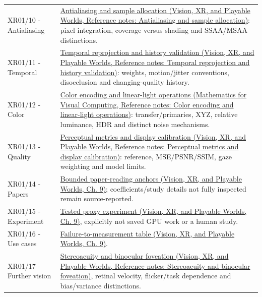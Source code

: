 {\begin{longtable}[]{@{}
  >{\raggedright\arraybackslash}p{}
  >{\raggedright\arraybackslash}p{}@{}}
XR01/10 - Antialiasing & \href{../07-Vision-XR-and-Playable-Worlds/main.pdf\#nameddest=appendix-4192b2bdd21e}{Antialiasing and sample allocation (Vision, XR, and Playable Worlds, Reference notes: Antialiasing and sample allocation)}: pixel integration, coverage versus shading and SSAA/MSAA distinctions. \\
XR01/11 - Temporal & \href{../07-Vision-XR-and-Playable-Worlds/main.pdf\#nameddest=appendix-0727340a4428}{Temporal reprojection and history validation (Vision, XR, and Playable Worlds, Reference notes: Temporal reprojection and history validation)}: weights, motion/jitter conventions, disocclusion and changing-quality history. \\
XR01/12 - Color & \href{../02-Mathematics-for-Visual-Computing/main.pdf\#nameddest=appendix-a9f83ad40792}{Color encoding and linear-light operations (Mathematics for Visual Computing, Reference notes: Color encoding and linear-light operations)}: transfer/primaries, XYZ, relative luminance, HDR and distinct noise mechanisms. \\
XR01/13 - Quality & \href{../07-Vision-XR-and-Playable-Worlds/main.pdf\#nameddest=appendix-b2c1846508bf}{Perceptual metrics and display calibration (Vision, XR, and Playable Worlds, Reference notes: Perceptual metrics and display calibration)}: reference, MSE/PSNR/SSIM, gaze weighting and model limits. \\
XR01/14 - Papers & \href{../07-Vision-XR-and-Playable-Worlds/main.pdf\#nameddest=04-visual-computing-ii-ch042-read-research-as-a-chain-of-questions-methods-and-bounded-conclusions}{Bounded paper-reading anchors (Vision, XR, and Playable Worlds, Ch. 9)}; coefficients/study details not fully inspected remain source-reported. \\
XR01/15 - Experiment & \href{../07-Vision-XR-and-Playable-Worlds/main.pdf\#nameddest=04-visual-computing-ii-ch042-complete-numerical-and-image-space-laboratory}{Tested proxy experiment (Vision, XR, and Playable Worlds, Ch. 9)}, explicitly not saved GPU work or a human study. \\
XR01/16 - Use cases & \href{../07-Vision-XR-and-Playable-Worlds/main.pdf\#nameddest=04-visual-computing-ii-ch042-diagnose-a-symptom-by-the-quantity-that-failed}{Failure-to-measurement table (Vision, XR, and Playable Worlds, Ch. 9)}. \\
XR01/17 - Further vision & \href{../07-Vision-XR-and-Playable-Worlds/main.pdf\#nameddest=appendix-8dc848f14052}{Stereoacuity and binocular foveation (Vision, XR, and Playable Worlds, Reference notes: Stereoacuity and binocular foveation)}, retinal velocity, flicker/task dependence and bias/variance distinctions. \\

\end{longtable}}
